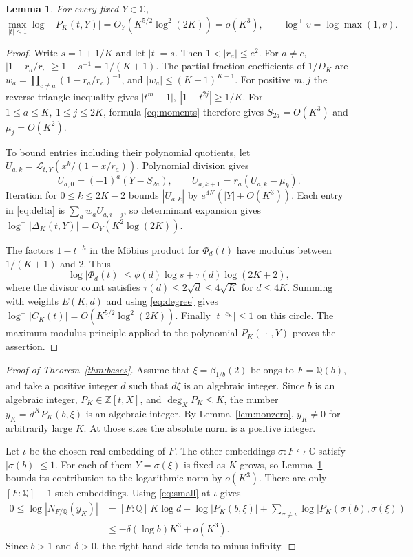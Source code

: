 \documentclass[11pt,letterpaper]{article}
\newcommand{\Q}{\mathbb Q}
\newcommand{\Z}{\mathbb Z}
\newcommand{\C}{\mathbb C}
\newcommand{\LL}{\mathcal L}
\newcommand{\logp}{\log^{+}}
\newtheorem{lemma}[theorem]{Lemma}
\begin{document}
\begin{lemma}\label{lem:disk}
For every fixed \(Y\in\C\),
\[
 \max_{|t|\le1}\logp|P_K(t,Y)|=O_Y(K^{5/2}\log^2(2K))=o(K^3),
 \qquad \logp v=\log\max(1,v).
\]
\end{lemma}
\begin{proof}
Write \(s=1+1/K\) and let \(|t|=s\). Then \(1<|r_a|\le e^2\).
For \(a\ne c\), \(|1-r_a/r_c|\ge1-s^{-1}=1/(K+1)\).
The partial-fraction coefficients of \(1/D_K\) are
\(w_a=\prod_{c\ne a}(1-r_a/r_c)^{-1}\), and
\(|w_a|\le(K+1)^{K-1}\). For positive \(m,j\) the reverse triangle
inequality gives \(|t^m-1|,\ |1+t^{2j}|\ge1/K\).
For \(1\le a\le K,\ 1\le j\le2K\), formula \eqref{eq:moments}
therefore gives \(S_{2a}=O(K^3)\) and \(\mu_j=O(K^2)\).

To bound entries including their polynomial quotients, let
\(U_{a,k}=\LL_{t,Y}(x^k/(1-x/r_a))\). Polynomial division gives
\[
  U_{a,0}=(-1)^a(Y-S_{2a}),\qquad U_{a,k+1}=r_a(U_{a,k}-\mu_k).
\]
Iteration for \(0\le k\le2K-2\) bounds \(|U_{a,k}|\) by
\(e^{4K}(|Y|+O(K^3))\). Each entry in \eqref{eq:delta} is
\(\sum_a w_aU_{a,i+j}\), so determinant expansion gives
\(\logp|\Delta_K(t,Y)|=O_Y(K^2\log(2K))\).

The factors \(1-t^{-h}\) in the Möbius product for \(\Phi_d(t)\) have
modulus between \(1/(K+1)\) and \(2\). Thus
\[
 \log|\Phi_d(t)|\le\phi(d)\log s+\tau(d)\log(2K+2),
\]
where the divisor count satisfies \(\tau(d)\le2\sqrt d\le4\sqrt K\)
for \(d\le4K\). Summing with weights \(E(K,d)\) and using
\eqref{eq:degree} gives \(\logp|C_K(t)|=O(K^{5/2}\log^2(2K))\).
Finally \(|t^{-c_K}|\le1\) on this circle. The maximum modulus principle
applied to the polynomial \(P_K(\,\cdot\,,Y)\) proves the assertion.
\end{proof}

\begin{proof}[Proof of Theorem~\ref{thm:bases}]
Assume that \(\xi=\beta_{1/b}(2)\) belongs to \(F=\Q(b)\), and take a
positive integer \(d\) such that \(d\xi\) is an algebraic integer.
Since \(b\) is an algebraic integer, \(P_K\in\Z[t,X]\), and
\(\deg_X P_K\le K\), the number \(y_K=d^KP_K(b,\xi)\) is an algebraic
integer. By Lemma~\ref{lem:nonzero}, \(y_K\ne0\) for arbitrarily large
\(K\). At those sizes the absolute norm is a positive integer.

Let \(\iota\) be the chosen real embedding of \(F\). The other embeddings
\(\sigma:F\hookrightarrow\C\) satisfy \(\lvert\sigma(b)\rvert\le1\).
For each of them \(Y=\sigma(\xi)\) is fixed as \(K\) grows, so
Lemma~\ref{lem:disk} bounds its contribution to the logarithmic norm by
\(o(K^3)\). There are only \([F:\Q]-1\) such embeddings. Using
\eqref{eq:small} at \(\iota\) gives
\begin{align*}
 0\le\log|N_{F/\Q}(y_K)|
 &= [F:\Q]\,K\log d+\log|P_K(b,\xi)|
       +\sum_{\sigma\ne\iota}\log|P_K(\sigma(b),\sigma(\xi))|\\
 &\le -\delta(\log b)K^3+o(K^3).
\end{align*}
Since \(b>1\) and \(\delta>0\), the right-hand side tends to minus infinity.
\end{proof}
\end{document}
